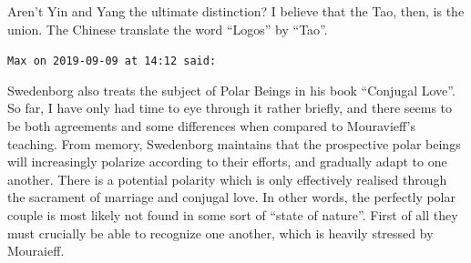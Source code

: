 \begin{footnotesize}
\begin{sffamily}
Aren't Yin and Yang the ultimate distinction? I believe that the Tao, then, is the union. The Chinese translate the word “Logos” by “Tao”.


\hfill

\texttt{Max on 2019-09-09 at 14:12 said: }

Swedenborg also treats the subject of Polar Beings in his book “Conjugal Love”. So far, I have only had time to eye through it rather briefly, and there seems to be both agreements and some differences when compared to Mouravieff's teaching. From memory, Swedenborg maintains that the prospective polar beings will increasingly polarize according to their efforts, and gradually adapt to one another. There is a potential polarity which is only effectively realised through the sacrament of marriage and conjugal love. In other words, the perfectly polar couple is most likely not found in some sort of “state of nature”. First of all they must crucially be able to recognize one another, which is heavily stressed by Mouraieff.


\end{sffamily}\end{footnotesize}

